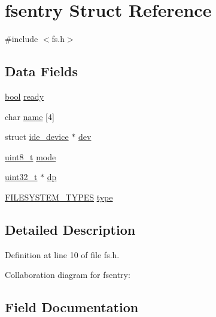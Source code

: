 \hypertarget{a00272}{}\section{fsentry Struct Reference}
\label{a00272}


{\ttfamily \#include $<$fs.\+h$>$}

\subsection*{Data Fields}
\begin{DoxyCompactItemize}
\item 
\hyperlink{a00140_af6a258d8f3ee5206d682d799316314b1_af6a258d8f3ee5206d682d799316314b1}{bool} \hyperlink{a00272_a284522ed97fe1eeebd0fcc039b2ea00a_a284522ed97fe1eeebd0fcc039b2ea00a}{ready}
\item 
char \hyperlink{a00272_a9c5a4f5b02eb2c9e9e797f79dc99028a_a9c5a4f5b02eb2c9e9e797f79dc99028a}{name} \mbox{[}4\mbox{]}
\item 
struct \hyperlink{a00224}{ide\+\_\+device} $\ast$ \hyperlink{a00272_aaea66ea744fa50f1c54666033884d8d2_aaea66ea744fa50f1c54666033884d8d2}{dev}
\item 
\hyperlink{a00140_aba7bc1797add20fe3efdf37ced1182c5_aba7bc1797add20fe3efdf37ced1182c5}{uint8\+\_\+t} \hyperlink{a00272_a6e71712bc3c51c21dc3362334937e4d7_a6e71712bc3c51c21dc3362334937e4d7}{mode}
\item 
\hyperlink{a00140_a435d1572bf3f880d55459d9805097f62_a435d1572bf3f880d55459d9805097f62}{uint32\+\_\+t} $\ast$ \hyperlink{a00272_ae1d22893563b8753e29fef01f0782ba5_ae1d22893563b8753e29fef01f0782ba5}{dp}
\item 
\hyperlink{a00161_a2e9d0c3765a28910638672bfc746181b_a2e9d0c3765a28910638672bfc746181b}{F\+I\+L\+E\+S\+Y\+S\+T\+E\+M\+\_\+\+T\+Y\+P\+ES} \hyperlink{a00272_acbab3dd44174c8f74e1d9305a13c7dbb_acbab3dd44174c8f74e1d9305a13c7dbb}{type}
\end{DoxyCompactItemize}


\subsection{Detailed Description}


Definition at line 10 of file fs.\+h.



Collaboration diagram for fsentry\+:


\subsection{Field Documentation}
\mbox{\label{a00272_aaea66ea744fa50f1c54666033884d8d2_aaea66ea744fa50f1c54666033884d8d2}} 
